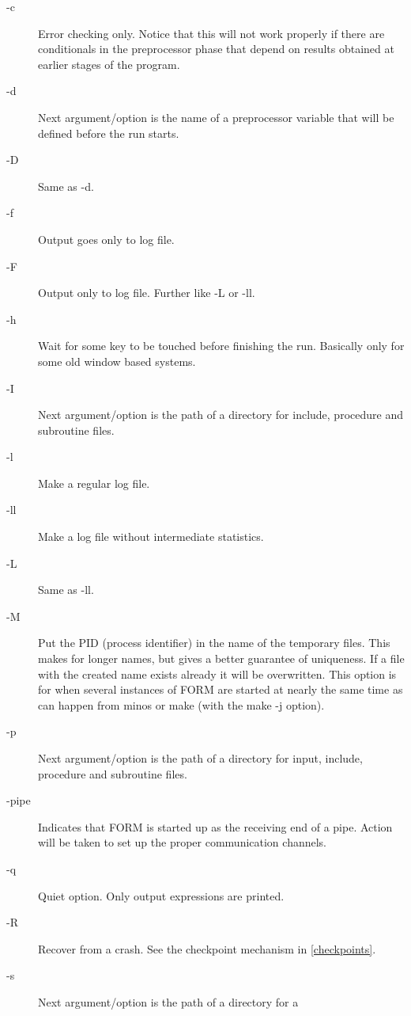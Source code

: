 \begin{description}
\item[-c] Error checking only. Notice that this will not work 
     properly if there are conditionals in the preprocessor phase that 
     depend on results obtained at earlier stages of the program.
\item[-d] Next argument/option is the name of a preprocessor 
     variable that will be defined before the run starts.
\item[-D] Same as -d.
\item[-f] Output goes only to log file.
\item[-F] Output only to log file. Further like -L or -ll.
\item[-h] Wait for some key to be touched before finishing the run.
     Basically only for some old window based systems.
\item[-I] Next argument/option is the path of a directory for 
     include, procedure and subroutine files.
\item[-l] Make a regular log file.
\item[-ll] Make a log file without intermediate statistics.
\item[-L] Same as -ll.
\item[-M] Put the PID (process identifier) in the name of the temporary 
     files. This makes for longer names, but gives a better guarantee of 
     uniqueness. If a file with the created name exists already it will be 
     overwritten. This option is for when several instances of FORM are 
     started at nearly the same time as can happen from minos or make (with 
     the make -j option).
\item[-p] Next argument/option is the path of a directory for 
     input, include, procedure and subroutine files.
\item[-pipe] Indicates that FORM is started up as the receiving 
     end of a pipe. Action will be taken to set up the proper communication 
     channels.
\item[-q] Quiet option. Only output expressions are printed.
\item[-R] Recover from a crash. See the checkpoint mechanism in \ref{checkpoints}.
\item[-s] Next argument/option is the path of a directory for a 

\end{description}
